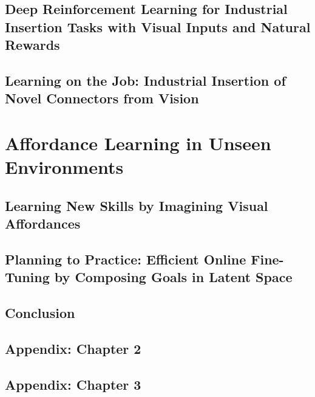 \documentclass[ titlepage,numbers=noenddot,headinclude,
                footinclude=true,cleardoublepage=empty,abstractoff,
                BCOR=5mm,paper=letter,fontsize=12pt,
                american,
                openany
                ]{scrreprt}
\begin{document}
\chapter{Deep Reinforcement Learning for Industrial Insertion Tasks with Visual Inputs and Natural Rewards}\label{chapter:insertion}

\chapter{Learning on the Job: Industrial Insertion of Novel Connectors from Vision}\label{chapter:daib}

\part{Affordance Learning in Unseen Environments}

\chapter{Learning New Skills by Imagining Visual Affordances}\label{chapter:val}

\chapter{Planning to Practice: Efficient Online Fine-Tuning by Composing Goals in Latent Space}\label{chapter:ptp}


\chapter{Conclusion}\label{chapter:conclusion}


\printbibliography

\appendix

\chapter{Appendix: Chapter 2}\label{app:rig}


\chapter{Appendix: Chapter 3}\label{app:ccrig}

\end{document}
